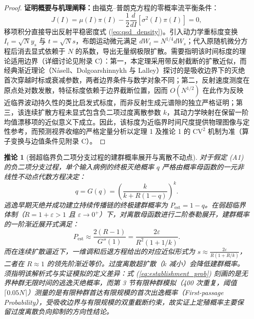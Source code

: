 \documentclass[11pt,a4paper]{article}
\theoremstyle{plain}
\newtheorem{corollary}{推论}
\theoremstyle{definition}
\begin{document}
\begin{proof}
\textbf{证明概要与机理阐释：}由福克--普朗克方程的零概率流平衡条件：
\begin{equation*}
J(I) = \mu(I)\pi(I) - \frac{1}{2}\frac{d}{dI}\left[\sigma^2(I)\pi(I)\right] = 0,
\end{equation*}
移项积分直接导出反射平稳密度式 (\ref{eq:qsd_density})。引入动力学重标度变换 $I_t = \sqrt{N} y_s$ 与 $t = \sqrt{N} s$，布朗运动微元满足 $dW_t = N^{1/4} dW_s$；代入原随机微分方程后消去显式依赖于 $N$ 的系数，导出无量纲极限扩散。需要指明该时间标度的理论适用边界（详细讨论见附录 C）：第一，本定理采用带反射截断的扩散近似，而经典渐近理论（N{\aa}sell\citep{nasell1999quasi}、Dolgoarshinnykh 与 Lalley\citep{dolgoarshinnykh2006critical}）探讨的是吸收边界下的灭绝首次穿越时标或衰减参数，两者边界条件与数学对象不同；第二，反射速度测度在原点处对数发散，特征标度依赖于边界截断位置，因而 $O(N^{1/2})$ 在此作为反映近临界波动持久性的类比启发式标度，而非反射生成元谱隙的独立严格证明；第三，该连续扩散方程未显式包含负二项过度离散参数 $k$，其动力学映射在保留一阶均值漂移项的近似意义下成立。因此，该标度为近临界时间尺度提供物理图像与定性参考，而预测视界收缩的严格定量分析以定理 1 及推论 1 的 $\text{CV}^2$ 机制为准（算子变换与边值条件见附录 C）。
\end{proof}

\begin{corollary}[弱超临界负二项分支过程的建群概率展开与离散不动点]\label{cor:establishment}
对于假定 (A1) 的负二项分支过程，单个输入病例的终极灭绝概率 $q$ 严格由概率母函数的一元非线性不动点代数方程决定：
\begin{equation}
q = G(q) = \left( \frac{k}{k + R(1 - q)} \right)^k.
\label{eq:pgf_fixed_point}
\end{equation}
逃逸早期灭绝并成功建立持续传播链的终极建群概率为 $P_{\text{est}} = 1 - q$。在弱超临界体制（$R = 1 + \varepsilon > 1$ 且 $\varepsilon \to 0^+$）下，对离散母函数进行二阶泰勒展开，建群概率的一阶渐近展开式满足：
\begin{equation}
P_{\text{est}} \approx \frac{2(R - 1)}{G''(1)} = \frac{2\varepsilon}{R^2(1 + 1/k)}.
\label{eq:establishment_prob}
\end{equation}
而在连续扩散逼近下，一维调和后退方程给出的对应近似形式为 $s \approx \frac{2\varepsilon}{R(1 + R/k)}$，二者在 $R \approx 1$ 的领先阶渐近等价。过度离散超扩散（$k$ 减小）会降低建群概率。须指明该解析式与实证模拟的定义差异：式 (\ref{eq:establishment_prob}) 刻画的是无界种群无限时间的逃逸灭绝概率，而第 3 节有限种群模拟（400 次重复，阈值 $\lceil 0.05N \rceil$）测量的是有限种群首达有限规模的首次出逸概率（First-passage Probability），受吸收边界与有限规模的双重截断约束，故实证上定殖概率主要保留过度离散负向抑制的方向性结论。
\end{corollary}
\end{document}
